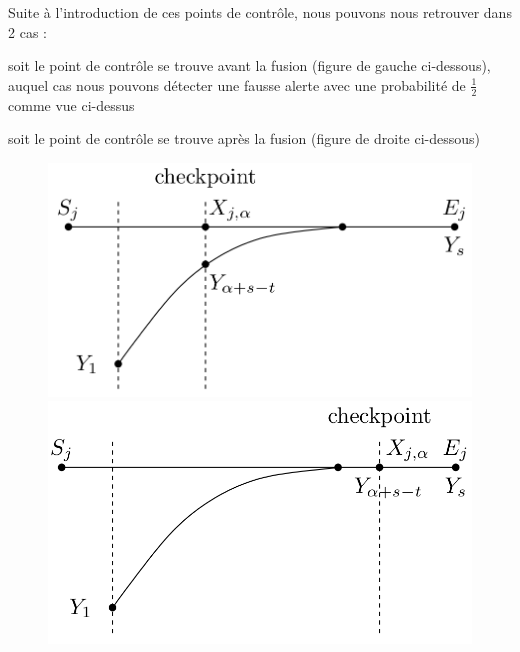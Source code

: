 \begin{samepage}
	Suite à l'introduction de ces points de contrôle, nous pouvons nous retrouver dans 2 cas :
	\bi
		\item soit le point de contrôle se trouve avant la fusion (figure de gauche ci-dessous), auquel cas nous pouvons détecter une fausse alerte avec une probabilité de $\frac{1}{2}$ comme vue ci-dessus
		\item soit le point de contrôle se trouve après la fusion (figure de droite ci-dessous)
	\ei
	\begin{figure}[H]
		\begin{minipage}{.5\textwidth}
			\includegraphics[width=0.9\linewidth]{other/FalseAlarmDetected.png}
		\end{minipage}
		\begin{minipage}{.5\textwidth}
			\includegraphics[width=0.9\linewidth]{other/FalseAlarmNotDetected.png}
		\end{minipage}
	\end{figure}
\end{samepage}


